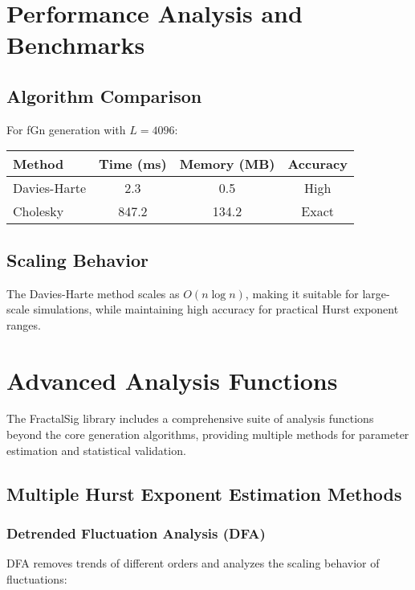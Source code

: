 \documentclass[11pt,a4paper]{article}
\begin{document}
\section{Performance Analysis and Benchmarks}

\subsection{Algorithm Comparison}

For fGn generation with $L = 4096$:

\begin{center}
\begin{tabular}{|l|c|c|c|}
\hline
\textbf{Method} & \textbf{Time (ms)} & \textbf{Memory (MB)} & \textbf{Accuracy} \\
\hline
Davies-Harte & 2.3 & 0.5 & High \\
Cholesky & 847.2 & 134.2 & Exact \\
\hline
\end{tabular}
\end{center}

\subsection{Scaling Behavior}

The Davies-Harte method scales as $O(n \log n)$, making it suitable for large-scale simulations, while maintaining high accuracy for practical Hurst exponent ranges.

\section{Advanced Analysis Functions}

The FractalSig library includes a comprehensive suite of analysis functions beyond the core generation algorithms, providing multiple methods for parameter estimation and statistical validation.

\subsection{Multiple Hurst Exponent Estimation Methods}

\subsubsection{Detrended Fluctuation Analysis (DFA)}

DFA removes trends of different orders and analyzes the scaling behavior of fluctuations:
\end{document}
